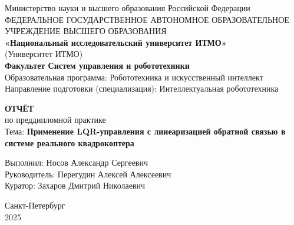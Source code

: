 \thispagestyle{empty}
\begin{center}
Министерство науки и высшего образования Российской Федерации\\
ФЕДЕРАЛЬНОЕ ГОСУДАРСТВЕННОЕ АВТОНОМНОЕ ОБРАЗОВАТЕЛЬНОЕ УЧРЕЖДЕНИЕ ВЫСШЕГО ОБРАЗОВАНИЯ\\
\textbf{«Национальный исследовательский университет ИТМО»}\\
(Университет ИТМО)\\
\vspace{1cm}
\textbf{Факультет Систем управления и робототехники}\\
Образовательная программа: Робототехника и искусственный интеллект\\
Направление подготовки (специализация): Интеллектуальная робототехника\\

\end{center}

\vspace{2cm}
\begin{center}
\textbf{ОТЧЁТ}\\
по преддипломной практике\\
Тема: \textbf{Применение LQR-управления с линеаризацией обратной связью в системе реального квадрокоптера}
\end{center}

\vspace{3cm}
\begin{flushright}
Выполнил: Носов Александр Сергеевич\\
Руководитель: Перегудин Алексей Алексеевич\\
Куратор: Захаров Дмитрий Николаевич
\end{flushright}

\vspace{5cm}
\begin{center}
Санкт-Петербург\\
2025
\end{center}

\endinput

